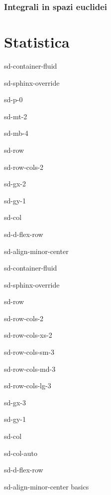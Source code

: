 \documentclass[letterpaper,10pt,english]{jupyterBook}
\begin{document}
\section{Integrali in spazi euclidei}
\label{\detokenize{ch/vector-calculus/integrals:integrali-in-spazi-euclidei}}\label{\detokenize{ch/vector-calculus/integrals:vector-calculus-integrals}}\label{\detokenize{ch/vector-calculus/integrals::doc}}
\sphinxstepscope


\part{Statistica}

\sphinxstepscope

\begin{sphinxuseclass}{sd-container-fluid}
\begin{sphinxuseclass}{sd-sphinx-override}
\begin{sphinxuseclass}{sd-p-0}
\begin{sphinxuseclass}{sd-mt-2}
\begin{sphinxuseclass}{sd-mb-4}
\begin{sphinxuseclass}{sd-row}
\begin{sphinxuseclass}{sd-row-cols-2}
\begin{sphinxuseclass}{sd-gx-2}
\begin{sphinxuseclass}{sd-gy-1}
\begin{sphinxuseclass}{sd-col}
\begin{sphinxuseclass}{sd-d-flex-row}
\begin{sphinxuseclass}{sd-align-minor-center}
\begin{sphinxuseclass}{sd-container-fluid}
\begin{sphinxuseclass}{sd-sphinx-override}
\begin{sphinxuseclass}{sd-row}
\begin{sphinxuseclass}{sd-row-cols-2}
\begin{sphinxuseclass}{sd-row-cols-xs-2}
\begin{sphinxuseclass}{sd-row-cols-sm-3}
\begin{sphinxuseclass}{sd-row-cols-md-3}
\begin{sphinxuseclass}{sd-row-cols-lg-3}
\begin{sphinxuseclass}{sd-gx-3}
\begin{sphinxuseclass}{sd-gy-1}
\begin{sphinxuseclass}{sd-col}
\begin{sphinxuseclass}{sd-col-auto}
\begin{sphinxuseclass}{sd-d-flex-row}
\begin{sphinxuseclass}{sd-align-minor-center}
\sphinxAtStartPar
basics


\end{sphinxuseclass}
\end{sphinxuseclass}
\end{sphinxuseclass}
\end{sphinxuseclass}
\end{sphinxuseclass}
\end{sphinxuseclass}
\end{sphinxuseclass}
\end{sphinxuseclass}
\end{sphinxuseclass}
\end{sphinxuseclass}
\end{sphinxuseclass}
\end{sphinxuseclass}
\end{sphinxuseclass}
\end{sphinxuseclass}
\end{sphinxuseclass}
\end{sphinxuseclass}
\end{sphinxuseclass}
\end{sphinxuseclass}
\end{sphinxuseclass}
\end{sphinxuseclass}
\end{sphinxuseclass}
\end{sphinxuseclass}
\end{sphinxuseclass}
\end{sphinxuseclass}
\end{sphinxuseclass}
\end{sphinxuseclass}
\end{document}

